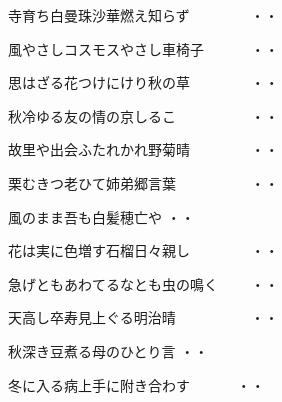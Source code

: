 \begin{shiika}寺育ち白曼珠沙華燃え知らず　　　　
\hfill{・・}\end{shiika}

\begin{shiika}風やさしコスモスやさし車椅子　　　
\hfill{・・}\end{shiika}

\begin{shiika}思はざる花つけにけり秋の草　　　　
\hfill{・・}\end{shiika}

\begin{shiika}秋冷ゆる友の情の京しるこ　　　　　
\hfill{・・}\end{shiika}

\begin{shiika}故里や出会ふたれかれ野菊晴　　　　
\hfill{・・}\end{shiika}

\begin{shiika}栗むきつ老ひて姉弟郷言葉　　　　　
\hfill{・・}\end{shiika}

\begin{shiika}風のまま吾も白髪穂亡や
\hfill{・・}\end{shiika}

\begin{shiika}花は実に色増す石榴日々親し　　　　
\hfill{・・}\end{shiika}

\begin{shiika}急げともあわてるなとも虫の鳴く　　
\hfill{・・}\end{shiika}

\begin{shiika}天高し卒寿見上ぐる明治晴　　　　　
\hfill{・・}\end{shiika}

\begin{shiika}秋深き豆煮る母のひとり言
\hfill{・・}\end{shiika}

\begin{shiika}冬に入る病上手に附き合わす　　　
\hfill{・・}\end{shiika}

